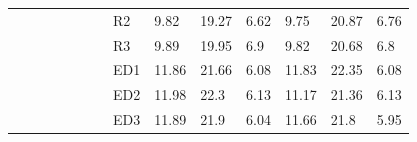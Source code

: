 {\begin{minipage}{\linewidth}
\begin{tabular}{l|l|l|l|c|c|r|l|lll|lll}
                                              &                                          &                                           &                                           &                                            &                                                                                         & \multicolumn{1}{c|}{}                                                                          & R2                                        & 9.82  & 19.27 & 6.62      & 9.75  & 20.87 & 6.76       \\
                                              &                                          &                                           &                                           &                                            &                                                                                         & \multicolumn{1}{c|}{}                                                                          & R3                                        & 9.89  & 19.95 & 6.9       & 9.82  & 20.68 & 6.8        \\
                                              &                                          &                                           &                                           &                                            &                                                                                         & \multicolumn{1}{c|}{}                                                                          & ED1                                       & 11.86 & 21.66 & 6.08      & 11.83 & 22.35 & 6.08       \\
                                              &                                          &                                           &                                           &                                            &                                                                                         & \multicolumn{1}{c|}{}                                                                          & ED2                                       & 11.98 & 22.3  & 6.13      & 11.17 & 21.36 & 6.13       \\
                                              &                                          &                                           &                                           &                                            &                                                                                         & \multicolumn{1}{c|}{}                                                                          & ED3                                       & 11.89 & 21.9  & 6.04      & 11.66 & 21.8  & 5.95       \\

\end{tabular}
\end{minipage}}
